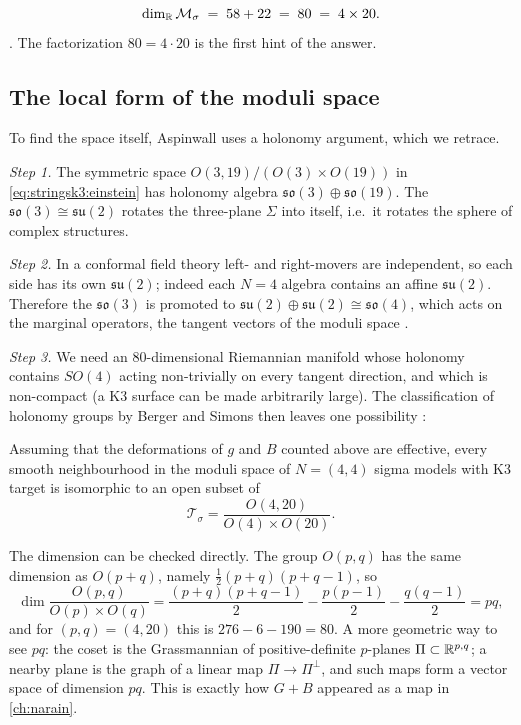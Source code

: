 \begin{equation}\label{eq:stringsk3:80}
  \dim_{\mathbb{R}}\mathcal M_\sigma \;=\; 58+22 \;=\; 80 \;=\; 4\times20 .
\end{equation}
. The factorization $80=4\cdot20$ is the first hint of the answer.

\subsection{The local form of the moduli space}
To find the space itself, Aspinwall uses a holonomy argument, which we retrace.

\emph{Step 1.} The symmetric space $O(3,19)/(O(3)\times O(19))$ in
\eqref{eq:stringsk3:einstein} has holonomy algebra $\mathfrak{so}(3)\oplus\mathfrak{so}(19)$. The
$\mathfrak{so}(3)\cong\mathfrak{su}(2)$ rotates the three-plane $\Sigma$ into itself, i.e.\ it
rotates the sphere of complex structures.

\emph{Step 2.} In a conformal field theory left- and right-movers are independent, so each
side has its own $\mathfrak{su}(2)$; indeed each $N=4$ algebra contains an affine
$\mathfrak{su}(2)$. Therefore the $\mathfrak{so}(3)$ is promoted to
$\mathfrak{su}(2)\oplus\mathfrak{su}(2)\cong\mathfrak{so}(4)$, which acts on the marginal
operators, the tangent vectors of the moduli space
.

\emph{Step 3.} We need an $80$-dimensional Riemannian manifold whose holonomy contains
$SO(4)$ acting non-trivially on every tangent direction, and which is non-compact (a K3
surface can be made arbitrarily large). The classification of holonomy groups by Berger and
Simons then leaves one possibility :

\begin{theorem}\label{thm:stringsk3:local}
Assuming that the deformations of $g$ and $B$ counted above are effective, every smooth
neighbourhood in the moduli space of $N=(4,4)$ sigma models with K3 target is isomorphic to an
open subset of
\begin{equation}\label{eq:stringsk3:teich}
  \mathcal T_\sigma=\frac{O(4,20)}{O(4)\times O(20)} .
\end{equation}
\end{theorem}

The dimension can be checked directly. The group $O(p,q)$ has the same dimension as
$O(p+q)$, namely $\tfrac12(p+q)(p+q-1)$, so
\begin{equation}\label{eq:stringsk3:dimpq}
  \dim\frac{O(p,q)}{O(p)\times O(q)}
  =\frac{(p+q)(p+q-1)}2-\frac{p(p-1)}2-\frac{q(q-1)}2=pq ,
\end{equation}
and for $(p,q)=(4,20)$ this is $276-6-190=80$. A more geometric way to see $pq$: the coset is
the Grassmannian of positive-definite $p$-planes $\Pi\subset\mathbb{R}^{p,q}$; a nearby plane is the
graph of a linear map $\Pi\to\Pi^\perp$, and such maps form a vector space of dimension $pq$.
This is exactly how $G+B$ appeared as a map in \cref{ch:narain}.

